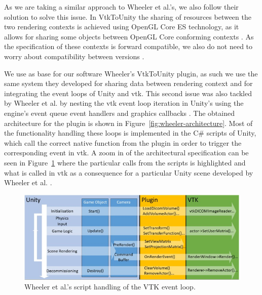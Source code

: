 As we are taking a similar approach to Wheeler et al.'s, we also follow their solution to solve this issue. In VtkToUnity the sharing of resources between the two rendering contexts is achieved using OpenGL Core ES technology, as it allows for sharing some objects between OpenGL Core conforming contexts \cite{wheeler_virtual_2018}. As the specification of these contexts is forward compatible, we also do not need to worry about compatibility between versions \cite{khronos_opengl_2021}.

We use as base for our software Wheeler's VtkToUnity plugin, as such we use the same system they developed for sharing data between rendering context and for integrating the event loops of Unity and \acrshort{vtk}. This second issue was also tackled by Wheeler et al. by nesting the \acrshort{vtk} event loop iteration in Unity's using the engine's event queue event handlers and graphics callbacks \cite{wheeler_virtual_2018}. The obtained architecture for the plugin is shown in Figure~\ref{fig:wheeler-architecture}. Most of the functionality handling these loops is implemented in the C\# scripts of Unity, which call the correct native function from the plugin in order to trigger the corresponding event in \acrshort{vtk}. A zoom in of the architectural specification can be seen in Figure~\ref{fig:wheeler-architecture-zoomin} where the particular calls from the scripts is highlighted and what is called in \acrshort{vtk} as a consequence for a particular Unity scene developed by Wheeler et al. \cite{wheeler_virtual_2018}.

\begin{figure}[t]
    \centering
    \includegraphics[width=\textwidth]{pictures/wheeler_architecture_zoomin.jpg}
    \caption{Wheeler et al.'s script handling of the VTK event loop.}
    \label{fig:wheeler-architecture-zoomin}
\end{figure}

